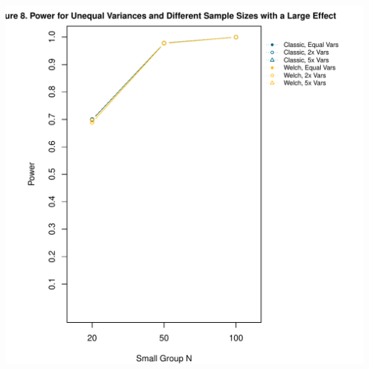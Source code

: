\documentclass[man]{apa6}\usepackage[]{graphicx}\usepackage[]{color}
\makeatletter
\def\maxwidth{ %
  \ifdim\Gin@nat@width>\linewidth
    \linewidth
  \else
    \Gin@nat@width
  \fi
}
\newenvironment{knitrout}{}{} %
\makeatother
\begin{document}
\begin{knitrout}
\includegraphics[width=\maxwidth]{figure/unequal_vars_equal_Ns_different_ds3} 

\end{knitrout}
\end{document}
